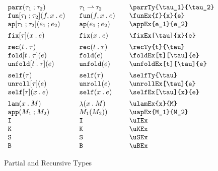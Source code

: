\documentclass[11pt]{article}
\begin{document}
\begin{figure}

  \begin{small}
    \begin{displaymath}
      \begin{array}{l@{\qquad}l@{\qquad}l@{\qquad}l}
        \parrTy{\tau_1}{\tau_2} & \parrTy*{\tau_1}{\tau_2} & \verb|\parrTy{\tau_1}{\tau_2}| \\
        \funEx{f}{x}{e}         & \funEx*{f}{x}{e}         & \verb|\funEx{f}{x}{e}|         \\
        \appEx{e_1}{e_2}        & \appEx*{e_1}{e_2}        & \verb|\appEx{e_1}{e_2}|        \\[1ex]
  
        \fixEx[\tau]{x}{e}      & \fixEx*[\tau]{x}{e}      & \verb|\fixEx[\tau]{x}{e}|      \\[1ex]
  
        \recTy{t}{\tau}         & \recTy*{t}{\tau}         & \verb|\recTy{t}{\tau}|         \\
        \foldEx[t][\tau]{e}     & \foldEx*{e}              & \verb|\foldEx[t][\tau]{e}|     \\
        \unfoldEx[t][\tau]{e}   & \unfoldEx*{e}            & \verb|\unfoldEx[t][\tau]{e}|   \\[1ex]
  
        \selfTy{\tau}           & \selfTy*{\tau}           & \verb|\selfTy{\tau}|           \\
        \unrollEx[\tau]{e}      & \unrollEx*{e}            & \verb|\unrollEx[\tau]{e}|      \\
        \selfEx[\tau]{x}{e}     & \selfEx*{x}{e}           & \verb|\selfEx[\tau]{x}{e}|     \\[1ex]

        \ulamEx{x}{M}           & \ulamEx*{x}{M}           & \verb|\ulamEx{x}{M}|           \\
        \uapEx{M_1}{M_2}        & \uapEx*{M_1}{M_2}        & \verb|\uapEx{M_1}{M_2}|        \\
        \uIEx                   & \uIEx*                   & \verb|\uIEx|                   \\
        \uKEx                   & \uKEx*                   & \verb|\uKEx|                   \\
        \uSEx                   & \uSEx*                   & \verb|\uSEx|                   \\
        \uBEx                   & \uBEx*                   & \verb|\uBEx|
      \end{array}
    \end{displaymath}
  \end{small}
  
  \caption{Partial and Recursive Types}
  \label{fig:recursive}
\end{figure}
\end{document}
